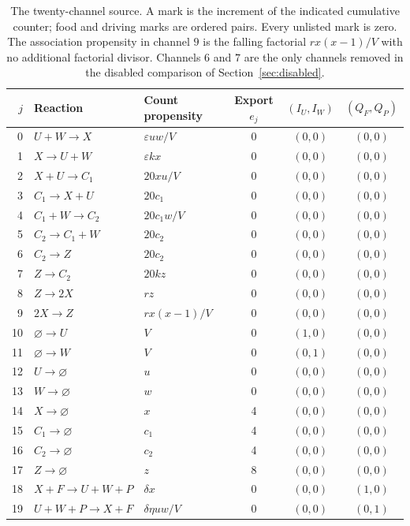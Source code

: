 \documentclass[11pt,a4paper]{article}
\theoremstyle{plain}
\theoremstyle{definition}
\theoremstyle{remark}
\newcommand{\eps}{\varepsilon}
\begin{document}
\begin{table}[t]
\centering\small
\caption{The twenty-channel source. A mark is the increment of the indicated cumulative counter; food and driving marks are ordered pairs. Every unlisted mark is zero. The association propensity in channel $9$ is the falling factorial $rx(x-1)/V$ with no additional factorial divisor. Channels $6$ and $7$ are the only channels removed in the disabled comparison of Section~\ref{sec:disabled}.}\label{tab:source}
\begin{tabular}{rllccc}
\toprule
$j$ & Reaction & Count propensity & Export $e_j$ & $(I_U,I_W)$ & $(Q_F,Q_P)$\\
\midrule
0 & $U+W\to X$ & $\eps uw/V$ & 0 & $(0,0)$ & $(0,0)$\\
1 & $X\to U+W$ & $\eps kx$ & 0 & $(0,0)$ & $(0,0)$\\
2 & $X+U\to C_1$ & $20xu/V$ & 0 & $(0,0)$ & $(0,0)$\\
3 & $C_1\to X+U$ & $20c_1$ & 0 & $(0,0)$ & $(0,0)$\\
4 & $C_1+W\to C_2$ & $20c_1w/V$ & 0 & $(0,0)$ & $(0,0)$\\
5 & $C_2\to C_1+W$ & $20c_2$ & 0 & $(0,0)$ & $(0,0)$\\
6 & $C_2\to Z$ & $20c_2$ & 0 & $(0,0)$ & $(0,0)$\\
7 & $Z\to C_2$ & $20kz$ & 0 & $(0,0)$ & $(0,0)$\\
8 & $Z\to2X$ & $rz$ & 0 & $(0,0)$ & $(0,0)$\\
9 & $2X\to Z$ & $rx(x-1)/V$ & 0 & $(0,0)$ & $(0,0)$\\
\midrule
10 & $\varnothing\to U$ & $V$ & 0 & $(1,0)$ & $(0,0)$\\
11 & $\varnothing\to W$ & $V$ & 0 & $(0,1)$ & $(0,0)$\\
12 & $U\to\varnothing$ & $u$ & 0 & $(0,0)$ & $(0,0)$\\
13 & $W\to\varnothing$ & $w$ & 0 & $(0,0)$ & $(0,0)$\\
14 & $X\to\varnothing$ & $x$ & 4 & $(0,0)$ & $(0,0)$\\
15 & $C_1\to\varnothing$ & $c_1$ & 4 & $(0,0)$ & $(0,0)$\\
16 & $C_2\to\varnothing$ & $c_2$ & 4 & $(0,0)$ & $(0,0)$\\
17 & $Z\to\varnothing$ & $z$ & 8 & $(0,0)$ & $(0,0)$\\
\midrule
18 & $X+F\to U+W+P$ & $\delta x$ & 0 & $(0,0)$ & $(1,0)$\\
19 & $U+W+P\to X+F$ & $\delta\eta uw/V$ & 0 & $(0,0)$ & $(0,1)$\\
\bottomrule
\end{tabular}
\end{table}
\end{document}
